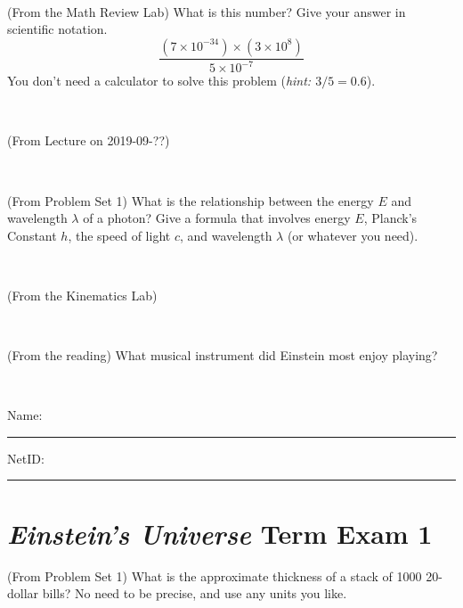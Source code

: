 \documentclass[12pt, letterpaper]{article}
\begin{document}
\vfill ~

\begin{problem} (From the Math Review Lab)
What is this number? Give your answer in scientific notation.
$$
\frac{(7\times10^{-34})\times(3\times10^8)}{5\times10^{-7}}
$$
You don't need a calculator to solve this problem (\textit{hint: $3/5=0.6$}).
\end{problem}


\vfill ~


\clearpage


\begin{problem} (From Lecture on 2019-09-??)
\end{problem}


\vfill ~

\begin{problem} (From Problem Set 1)
What is the relationship between the energy $E$ and wavelength
$\lambda$ of a photon? Give a formula that involves energy $E$,
Planck's Constant $h$, the speed of light $c$, and wavelength
$\lambda$ (or whatever you need).
\end{problem}

\vfill ~

\begin{problem} (From the Kinematics Lab)

\end{problem}


\vfill ~

\begin{problem} (From the reading)
What musical instrument did Einstein most enjoy playing?
\end{problem}


\vfill ~


\cleardoublepage



\noindent
Name: \rule[-1ex]{0.60\textwidth}{0.1pt}
NetID: \rule[-1ex]{0.20\textwidth}{0.1pt}

\section*{\textsl{Einstein's Universe} Term Exam 1}
\setcounter{problem}{1}


\begin{problem} (From Problem Set 1)
What is the approximate thickness of a stack of 1000 20-dollar bills?
No need to be precise, and use any units you like.
\end{problem}


\vfill ~
\end{document}
